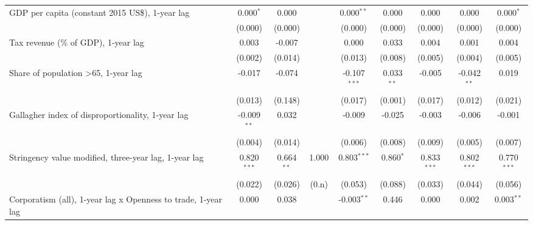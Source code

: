 \begin{table}[htbp]
\begin{tabular}{lcccccccc}
      GDP per capita (constant 2015 US\$), 1-year lag               & 0.000$^{*}$   & 0.000                     &              & 0.000$^{**}$   & 0.000            & 0.000           & 0.000           & 0.000$^{*}$\\   
                                                                    & (0.000)       & (0.000)                   &              & (0.000)        & (0.000)          & (0.000)         & (0.000)         & (0.000)\\   
      Tax revenue (\% of GDP), 1-year lag                           & 0.003         & -0.007                    &              & 0.000          & 0.033            & 0.004           & 0.001           & 0.004\\   
                                                                    & (0.002)       & (0.014)                   &              & (0.013)        & (0.008)          & (0.005)         & (0.004)         & (0.005)\\   
      Share of population >65, 1-year lag                           & -0.017        & -0.074                    &              & -0.107$^{***}$ & 0.033$^{**}$     & -0.005          & -0.042$^{**}$   & 0.019\\   
                                                                    & (0.013)       & (0.148)                   &              & (0.017)        & (0.001)          & (0.017)         & (0.012)         & (0.021)\\   
      Gallagher index of disproportionality, 1-year lag             & -0.009$^{**}$ & 0.032                     &              & -0.009         & -0.025           & -0.003          & -0.006          & -0.001\\   
                                                                    & (0.004)       & (0.014)                   &              & (0.006)        & (0.008)          & (0.009)         & (0.005)         & (0.007)\\   
      Stringency value modified, three-year lag, 1-year lag         & 0.820$^{***}$ & 0.664$^{**}$              & 1.000        & 0.803$^{***}$  & 0.860$^{*}$      & 0.833$^{***}$   & 0.802$^{***}$   & 0.770$^{***}$\\   
                                                                    & (0.022)       & (0.026)                   & (0.n)        & (0.053)        & (0.088)          & (0.033)         & (0.044)         & (0.056)\\   
      Corporatism (all), 1-year lag x Openness to trade, 1-year lag & 0.000         & 0.038                     &              & -0.003$^{**}$  & 0.446            & 0.000           & 0.002           & 0.003$^{**}$\\   

\end{tabular}
\end{table}
